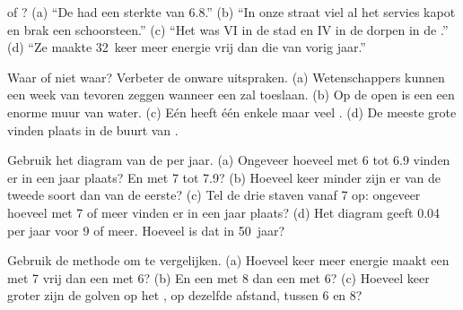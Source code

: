 \begin{exercise}[$\star$]\label{exo:g7:earthquakes:3}
 of ? (a) ``De  had een sterkte van 6.8.''
(b) ``In onze straat viel al het servies kapot en brak een schoorsteen.''
(c) ``Het was VI in de stad en IV in de dorpen in de .'' (d) ``Ze
maakte 32~keer meer energie vrij dan die van vorig jaar.''
\end{exercise}

\begin{exercise}[$\star$]\label{exo:g7:earthquakes:4}
Waar of niet waar? Verbeter de onware uitspraken. (a) Wetenschappers kunnen
een week van tevoren zeggen wanneer een  zal toeslaan. (b) Op de
open  is een  een enorme muur van water. (c) Eén 
heeft één enkele  maar veel . (d) De meeste grote
 vinden plaats in de buurt van .
\end{exercise}

\begin{exercise}[$\star\star$]\label{exo:g7:earthquakes:5}
Gebruik het diagram van de  per jaar. (a) Ongeveer hoeveel
 met  6 tot 6.9 vinden er in een jaar plaats? En met
 7 tot 7.9? (b) Hoeveel keer minder zijn er van de tweede soort
dan van de eerste? (c) Tel de drie staven vanaf 7 op: ongeveer hoeveel
 met  7 of meer vinden er in een jaar plaats? (d) Het
diagram geeft 0.04 per jaar voor  9 of meer. Hoeveel is dat in
50~jaar?
\end{exercise}

\begin{exercise}[$\star\star$]\label{exo:g7:earthquakes:6}
Gebruik de methode om  te vergelijken. (a) Hoeveel keer meer
energie maakt een  met  7 vrij dan een met  6?
(b) En een met  8 dan een met  6? (c) Hoeveel keer
groter zijn de golven op het , op dezelfde afstand, tussen
 6 en 8?
\end{exercise}

